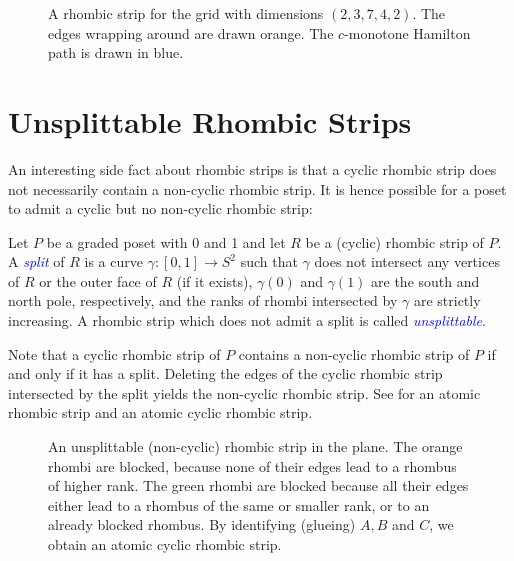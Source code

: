 \documentclass[fontsize=11pt,a4paper,DIV=12]{scrartcl}
\newcommand{\defn}[1]{\textsl{\textcolor{Blue}{#1}}}
\begin{document}
\begin{figure}
    \centering
    \makebox[\textwidth][c]{}
    \caption{A rhombic strip for the grid with dimensions $(2,3,7,4,2)$. The edges wrapping around are drawn orange. The $c$-monotone Hamilton path is drawn in blue.}
    \label{fig:multiset large}
\end{figure}

\section{Unsplittable Rhombic Strips}

An interesting side fact about rhombic strips is that a cyclic rhombic strip does not necessarily contain a non-cyclic rhombic strip. It is hence possible for a poset to admit a cyclic but no non-cyclic rhombic strip:

Let $P$ be a graded poset with 0 and 1 and let $R$ be a (cyclic) rhombic strip of $P$. A \defn{split} of $R$ is a curve $\gamma\colon[0,1]\to S^2$ such that $\gamma$ does not intersect any vertices of $R$ or the outer face of $R$ (if it exists), $\gamma(0)$ and $\gamma(1)$ are the south and north pole, respectively, and the ranks of rhombi intersected by $\gamma$ are strictly increasing. A rhombic strip which does not admit a split is called \defn{unsplittable}.

Note that a cyclic rhombic strip of $P$ contains a non-cyclic rhombic strip of $P$ if and only if it has a split. Deleting the edges of the cyclic rhombic strip intersected by the split yields the non-cyclic rhombic strip. See  for an atomic rhombic strip and an atomic cyclic rhombic strip.

\begin{figure}
    \centering
    
    \caption{An unsplittable (non-cyclic) rhombic strip in the plane. The orange rhombi are blocked, because none of their edges lead to a rhombus of higher rank. The green rhombi are blocked because all their edges either lead to a rhombus of the same or smaller rank, or to an already blocked rhombus. By identifying (glueing) $A,B$ and $C$, we obtain an atomic cyclic rhombic strip.}
    \label{fig:atomic plane}
\end{figure}
\end{document}
